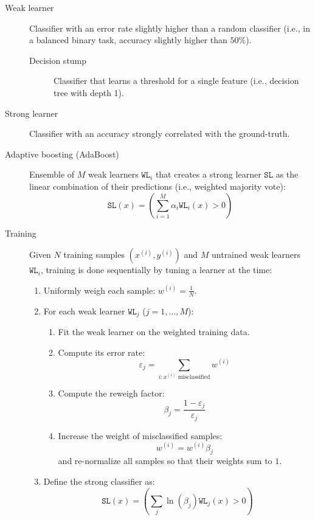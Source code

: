 \begin{description}
    \item[Weak learner] 
        Classifier with an error rate slightly higher than a random classifier (i.e., in a balanced binary task, accuracy slightly higher than $50\%$).

        \begin{description}
            \item[Decision stump] 
                Classifier that learns a threshold for a single feature (i.e., decision tree with depth 1).
        \end{description}

    \item[Strong learner] 
        Classifier with an accuracy strongly correlated with the ground-truth.

    \item[Adaptive boosting (AdaBoost)] 
        Ensemble of $M$ weak learners $\texttt{WL}_i$ that creates a strong learner $\texttt{SL}$ as the linear combination of their predictions (i.e., weighted majority vote):
        \[ \texttt{SL}(x) = \left( \sum_{i=1}^{M} \alpha_i \texttt{WL}_i(x) > 0 \right) \]

    \item[Training] 
        Given $N$ training samples $(x^{(i)}, y^{(i)})$ and $M$ untrained weak learners $\texttt{WL}_i$, training is done sequentially by tuning a learner at the time:
        \begin{enumerate}
            \item Uniformly weigh each sample: $w^{(i)} = \frac{1}{N}$.
            \item For each weak learner $\texttt{WL}_j$ ($j=1, \dots, M$):
            \begin{enumerate}
                \item Fit the weak learner on the weighted training data.
                \item Compute its error rate:
                \[ \varepsilon_j = \sum_{i: x^{(i)} \text{ misclassified}} w^{(i)} \]
                \item Compute the reweigh factor:
                \[ \beta_j = \frac{1 - \varepsilon_j}{\varepsilon_j} \]
                \item Increase the weight of misclassified samples:
                \[ w^{(i)} = w^{(i)} \beta_j \]
                and re-normalize all samples so that their weights sum to $1$.
            \end{enumerate}
            \item Define the strong classifier as:
            \[ \texttt{SL}(x) = \left( \sum_{j} \ln(\beta_j) \texttt{WL}_j(x) > 0 \right) \]
        \end{enumerate}


\end{description}
